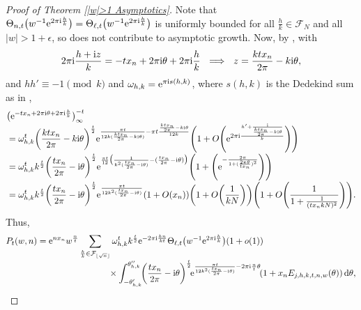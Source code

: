 \documentclass[pdftex]{sigma}
\numberwithin{equation}{section}
\begin{document}
\begin{proof}[Proof of Theorem \ref{|w|>1 Asymptotics}]
 Note that $\Theta_{n,t}\big(w^{-1}{\rm e}^{2\pi {\rm i} \frac{h}{k}}\big)=\Theta_{\ell,t}\big(w^{-1}{\rm e}^{2\pi {\rm i} \frac{h}{k}}\big)$ is uniformly bounded for all $\frac{h}{k} \in \mathcal{F}_N$ and all $|w|>1+\epsilon$, so does not contribute to asymptotic growth. Now, by \cite[equation~(5.2.2)]{Andrews}, with
 \begin{align*}
 2\pi {\rm i} \frac{h+{\rm i}z}{k}=-tx_n+2\pi {\rm i} \theta+2\pi {\rm i} \frac{h}{k} \ \implies\  z=\frac{ktx_n}{2\pi}-k{\rm i}\theta,
 \end{align*}
 and $hh' \equiv -1 \pmod{k}$ and $\omega_{h,k}={\rm e}^{\pi {\rm i} s(h,k)}$, where $s(h,k)$ is the Dedekind sum as in \cite[equation~(5.2.4)]{Andrews},
\begin{align*}
 &\big({\rm e}^{-tx_n+2\pi {\rm i} \theta+2\pi {\rm i} \frac{h}{k}}\big)_{\infty}^{-t} \\[-1mm]
 &{}= \omega_{h,k}^t \biggl(\frac{ktx_n}{2\pi}-k{\rm i}\theta\biggr)^{\frac{t}{2}}{\rm e}^{\frac{\pi t}{12k(\frac{ktx_n}{2\pi}-k{\rm i}\theta)}-\pi t\frac{\frac{ktx_n}{2\pi}-k{\rm i}\theta}{12k}}\Biggl(1+O\Biggl( {\rm e}^{2\pi {\rm i}\frac{h'+\frac{{\rm i}}{\frac{ktx_n}{2\pi}-k{\rm i}\theta}}{k}}\Biggr) \Biggr) \\[-1mm]
 &{}= \omega_{h,k}^t k^{\frac{t}{2}} \biggl(\frac{tx_n}{2\pi}-{\rm i}\theta\biggr)^{\frac{t}{2}}{\rm e}^{\frac{\pi t}{12}\big(\frac{1}{k^2(\frac{tx_n}{2\pi}-{\rm i}\theta)}-(\frac{tx_n}{2\pi}-{\rm i}\theta)\big)}\Biggl(1+\Biggl( {\rm e}^{- \frac{2\pi}{1+(\frac{2\pi\theta}{tx_n})^2}}\Biggr) \Biggr) \\[-1mm]
 &{}= \omega_{h,k}^t k^{\frac{t}{2}} \biggl(\frac{tx_n}{2\pi}-{\rm i}\theta\biggr)^{\frac{t}{2}}{\rm e}^{\frac{\pi t}{12k^2(\frac{tx_n}{2\pi}-{\rm i}\theta)}}(1+O(x_n)) \biggl(1+O\biggl(\frac{1}{kN}\biggr) \biggr) \Biggl(1+O\Biggl( \frac{1}{1+\frac{1}{(tx_nkN)^2}}\Biggr) \Biggr).
\end{align*}
Thus,
 \begin{align}
 P_t(w,n) &{}={\rm e}^{nx_n}w^{\frac{n}{t}} \sum_{\frac{h}{k} \in \mathcal{F}_{\lfloor \sqrt{n} \rfloor}} \omega_{h,k}^tk^{\frac{t}{2}}{\rm e}^{-2\pi {\rm i} \frac{hn}{kt}}\Theta_{\ell,t}\big(w^{-1}{\rm e}^{2\pi {\rm i} \frac{h}{k}}\big)(1+o(1)) \label{E:CircleMethodSeries}\\[-1mm]
 &\hphantom{={\rm e}^{nx_n}w^{\frac{n}{t}} \sum_{\frac{h}{k} \in \mathcal{F}_{\lfloor \sqrt{n} \rfloor}}}{}
 \times \int_{-\theta_{h,k}'}^{\theta_{h,k}''} \! \biggl(\frac{tx_n}{2\pi}-{\rm i}\theta\biggr)^{\frac{t}{2}}\!{\rm e}^{\frac{\pi t}{12k^2(\frac{tx_n}{2\pi}-{\rm i}\theta)}-2\pi {\rm i} \frac{n}{t} \theta}\! (1+x_n E_{j,h,k,t,n,w}(\theta))\, {\rm d}\theta, \nonumber

\end{align}
\end{proof}
\end{document}
